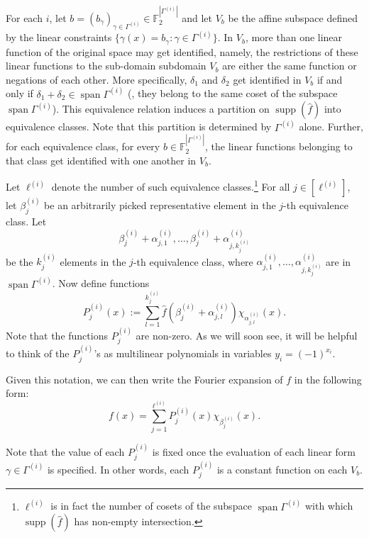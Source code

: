 \documentclass{toc}
\DeclareMathOperator{\Supp}{supp}
\DeclareMathOperator{\vspan}{span}
\begin{document}
For each $i$, let $b=(b_\gamma)_{\gamma \in \Gamma^{(i)}} \in
\mathbb{F}_2^{|\Gamma^{(i)}|}$ and let $V_{b}$ be the affine subspace
defined by the linear constraints $\{\gamma(x)=b_\gamma: \gamma \in
\Gamma^{(i)}\}$.  In $V_b$, more than one linear function of the
original space may get identified,
%
namely,  %
the restrictions of these linear functions to the
sub-domain  %
subdomain   %
$V_b$ are either the same function or negations of each
  other. More specifically, $\delta_1$ and $\delta_2$ get
identified in $V_b$ if and only if $\delta_1 + \delta_2 \in
\vspan\Gamma^{(i)}$ (\ie, %
they belong to the same coset of the subspace $\vspan\Gamma^{(i)}$). This equivalence relation
induces a partition on $\Supp(\widehat{f})$
into equivalence classes. Note that this partition is determined by $\Gamma^{(i)}$ alone.
Further, for each equivalence class, for every $b \in
\mathbb{F}_2^{|\Gamma^{(i)}|}$, the linear functions belonging to
that class get identified with one another in $V_b$. 

Let $\ell^{(i)}$ denote the number of such equivalence classes.\footnote{$\ell^{(i)}$ is in fact the number of cosets of the subspace
$\vspan\Gamma^{(i)}$ with which $\Supp(\widehat{f})$ has non-empty
intersection.} For all $j \in [\ell^{(i)}]$, let $\beta_j^{(i)}$ be an arbitrarily picked
representative element in the $j$-th equivalence class. Let
\[
  \beta_j^{(i)} + \alpha_{j,1}^{(i)},
  \ldots, \beta_j^{(i)} + \alpha_{j,{k_j^{(i)}}}^{(i)}
\]
be the $k_j^{(i)}$ elements in the $j$-th equivalence class, where
$\alpha_{j,1}^{(i)}, \ldots, \alpha_{j,{k_j^{(i)}}}^{(i)}$ are in
$\vspan\Gamma^{(i)}$. Now define functions
\[
  P_j^{(i)}(x) := \displaystyle\sum_{l=1}^{k_j^{(i)}}
  \widehat{f}\left(\beta_j^{(i)}+\alpha_{j,l}^{(i)}\right)\chi_{\alpha_{j,l}^{(i)}}(x).
\]
Note that the functions $P_j^{(i)}$ are non-zero.  As we will soon
see, it will be helpful to think of the $P_j^{(i)}$'s as
%
multilinear   %
polynomials in variables $y_i=(-1)^{x_i}$.

Given this notation, we can then write the Fourier expansion of $f$ in
the following form:
\[f(x)=\displaystyle\sum_{j=1}^{\ell^{(i)}}P_j^{(i)}(x)\chi_{\beta_j^{(i)}}(x).\]

Note that the value of each $P_j^{(i)}$ is fixed once the evaluation of each linear form $\gamma \in \Gamma^{(i)}$ is specified. In other words, each $P_j^{(i)}$ is a
constant function on each $V_b$.
\end{document}
